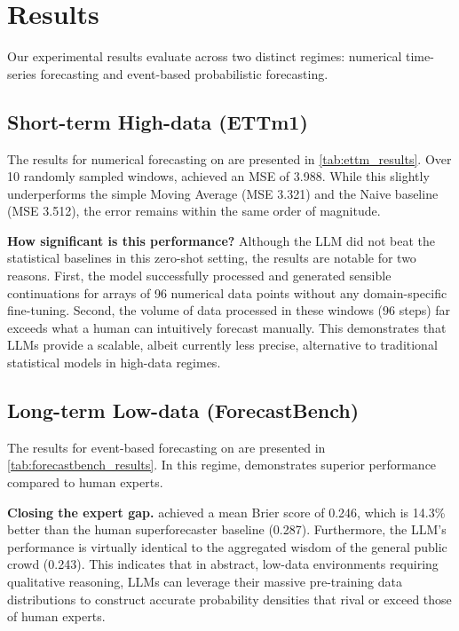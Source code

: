 \section{Results}

Our experimental results evaluate \methodname across two distinct regimes: numerical time-series forecasting and event-based probabilistic forecasting.

\subsection{Short-term High-data (ETTm1)}

The results for numerical forecasting on \ettm are presented in \cref{tab:ettm_results}. Over 10 randomly sampled windows, \methodname achieved an MSE of 3.988. While this slightly underperforms the simple Moving Average (MSE 3.321) and the Naive baseline (MSE 3.512), the error remains within the same order of magnitude.

{\bf How significant is this performance?} Although the LLM did not beat the statistical baselines in this zero-shot setting, the results are notable for two reasons. First, the model successfully processed and generated sensible continuations for arrays of 96 numerical data points without any domain-specific fine-tuning. Second, the volume of data processed in these windows (96 steps) far exceeds what a human can intuitively forecast manually. This demonstrates that LLMs provide a scalable, albeit currently less precise, alternative to traditional statistical models in high-data regimes.



\subsection{Long-term Low-data (ForecastBench)}

The results for event-based forecasting on \forecastbench are presented in \cref{tab:forecastbench_results}. In this regime, \methodname demonstrates superior performance compared to human experts.

{\bf Closing the expert gap.} \methodname achieved a mean Brier score of 0.246, which is 14.3\% better than the human superforecaster baseline (0.287). Furthermore, the LLM's performance is virtually identical to the aggregated wisdom of the general public crowd (0.243). This indicates that in abstract, low-data environments requiring qualitative reasoning, LLMs can leverage their massive pre-training data distributions to construct accurate probability densities that rival or exceed those of human experts.


